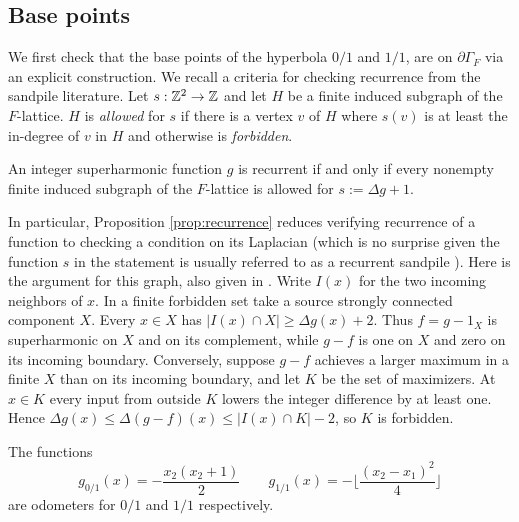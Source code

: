 \documentclass[12pt]{amsart}
\begin{document}
\subsection{Base points}
We first check that the base points of the hyperbola $0/1$ and $1/1$, are on $\partial \Gamma_F$ via an explicit construction. 
We recall a criteria for checking recurrence from the sandpile literature.  
Let $s: \mathbb{Z}^2 \to \mathbb{Z}$ and let $H$ be a finite induced subgraph of the $F$-lattice. $H$ is {\it allowed} for $s$ if there is 
a vertex $v$ of $H$ where $s(v)$ is at least the in-degree of $v$ in $H$ and otherwise is {\it forbidden}. 

\begin{prop} \label{prop:recurrence} \cite{holroyd2008chip}
	An integer superharmonic function $g$ is recurrent if and only if every nonempty finite induced subgraph 
	of the $F$-lattice is allowed for $s := \Delta g+1$. 
\end{prop}
In particular, Proposition \ref{prop:recurrence} reduces verifying recurrence of a function to checking a condition on its Laplacian
(which is no surprise given the function $s$ in the statement is usually referred to as a recurrent sandpile \cite{levine2010sandpile}). 
Here is the argument for this graph, also given in \cite[Proposition 3.3]{bou2021convergence}. Write $I(x)$ for the two incoming neighbors of $x$. In a finite forbidden set take a source strongly connected component $X$. Every $x\in X$ has $|I(x)\cap X|\ge\Delta g(x)+2$. Thus $f=g-1_X$ is superharmonic on $X$ and on its complement, while $g-f$ is one on $X$ and zero on its incoming boundary. Conversely, suppose $g-f$ achieves a larger maximum in a finite $X$ than on its incoming boundary, and let $K$ be the set of maximizers. At $x\in K$ every input from outside $K$ lowers the integer difference by at least one. Hence $\Delta g(x)\le\Delta(g-f)(x)\le |I(x)\cap K|-2$, so $K$ is forbidden. 



\begin{lemma} \label{lemma:checkerboard_recurrence}
The functions 
\[
g_{0/1}(x) = -\frac{x_2 (x_2 + 1)}{2} \qquad g_{1/1}(x) = -\lfloor \frac{(x_2-x_1)^2}{4} \rfloor
\]
are odometers for $0/1$ and $1/1$ respectively. 
\end{lemma}
\end{document}
